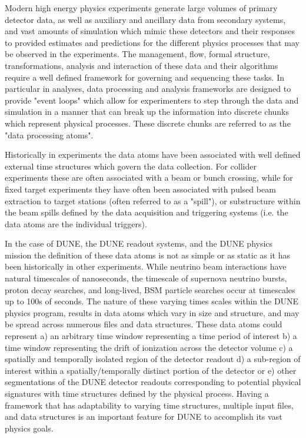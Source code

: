 \documentclass[../main-v1.tex]{subfiles}
\begin{document}
Modern high energy physics experiments generate large volumes of primary detector data, as well as auxiliary and ancillary data from secondary systems, and vast amounts of simulation which mimic these detectors and their responses to provided estimates and predictions for the different physics processes that may be observed in the experiments.  The management, flow, formal structure, transformations, analysis and interaction of these data and their algorithms require a well defined framework for governing and sequencing these tasks.  In particular in  analyses, data processing and analysis frameworks are designed to provide "event loops" which allow for experimenters to step through the data and simulation in a manner that can break up the information into discrete chunks which represent physical processes.  These discrete chunks are referred to as the "data processing atoms".

Historically in  experiments the data atoms have been associated with well defined external time structures which govern the data collection.  For collider experiments these are often associated with a beam or bunch crossing, while for fixed target experiments they have often been associated with pulsed beam extraction to target stations (often referred to as a "spill"), or substructure within the beam spills defined by the data acquisition and triggering systems (i.e. the data atoms are the individual triggers).  

In the case of DUNE, the DUNE readout systems, and the DUNE physics mission the definition of these data atoms is not as simple or as static as it has been historically in other experiments.  While neutrino beam interactions have natural timescales of nanoseconds, the timescale of supernova neutrino bursts, proton decay searches, and long-lived, BSM particle searches occur at timescales up to 100s of seconds. The nature of these varying times scales within the DUNE physics program, results in data atoms which vary in size and structure, and may be spread across numerous files and data structures. These data atoms could represent a) an arbitrary time window representing a time period of interest b) a time window representing the drift of ionization across the detector volume c) a spatially and temporally isolated region of the detector readout d) a sub-region of interest within a spatially/temporally distinct portion of the detector or e) other segmentations of the DUNE detector readouts corresponding to potential physical signatures with time structures defined by the physical process. Having a framework that has adaptability to varying time structures, multiple input files, and data structures is an important feature for DUNE to accomplish its vast physics goals.
\end{document}
